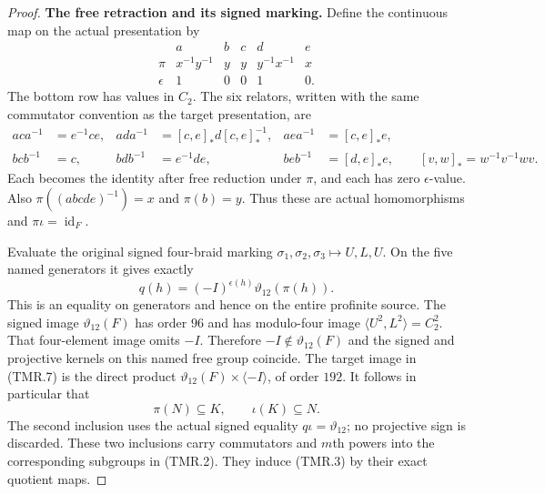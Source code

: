 \begin{proof}
\par\medskip\noindent\textbf{The free retraction and its signed marking.}\quad
Define the continuous map on the actual presentation
by
\[
 \begin{array}{c|ccccc}
             &a&b&c&d&e\\ \hline
 \pi         &x^{-1}y^{-1}&y&y&y^{-1}x^{-1}&x\\
 \epsilon    &1&0&0&1&0 .
 \end{array}                                                    \tag{TMR.5}
\]
The bottom row has values in $C_2$.
The six relators, written with the same commutator
convention as the target presentation, are
\[
\begin{aligned}
 aca^{-1}&=e^{-1}ce,&
 ada^{-1}&=[c,e]_*d[c,e]_*^{-1},&
 aea^{-1}&=[c,e]_*e,\\
 bcb^{-1}&=c,&
 bdb^{-1}&=e^{-1}de,&
 beb^{-1}&=[d,e]_*e,
 \qquad [v,w]_* =w^{-1}v^{-1}wv.
\end{aligned}                                                    \tag{TMR.6}
\]
Each becomes the identity after free reduction
under $\pi$, and each has zero $\epsilon$-value.
Also $\pi((abcde)^{-1})=x$ and $\pi(b)=y$.
Thus these are actual homomorphisms and
$\pi\iota=\operatorname{id}_F$.

Evaluate the original signed four-braid marking
$\sigma_1,\sigma_2,\sigma_3\mapsto U,L,U$.
On the five named generators it gives exactly
\[
                   q(h)=(-I)^{\epsilon(h)}
                                      \vartheta_{12}(\pi(h)).
                                                               \tag{TMR.7}
\]
This is an equality on generators and hence on
the entire profinite source.
The signed image $\vartheta_{12}(F)$ has order
$96$ and has modulo-four image
$\langle U^2,L^2\rangle=C_2^2$.
That four-element image omits $-I$.
Therefore $-I\notin\vartheta_{12}(F)$ and the
signed and projective kernels on this named
free group coincide.
The target image in (TMR.7) is the direct product
$\vartheta_{12}(F)\times\langle-I\rangle$,
of order $192$.
It follows in particular that
\[
         \pi(N)\subseteq K,\qquad \iota(K)\subseteq N.
                                                               \tag{TMR.8}
\]
The second inclusion uses the actual signed
equality $q\iota=\vartheta_{12}$; no projective
sign is discarded.
These two inclusions carry commutators and
$m$th powers into the corresponding subgroups
in (TMR.2).  They induce (TMR.3) by their exact
quotient maps.


\end{proof}
